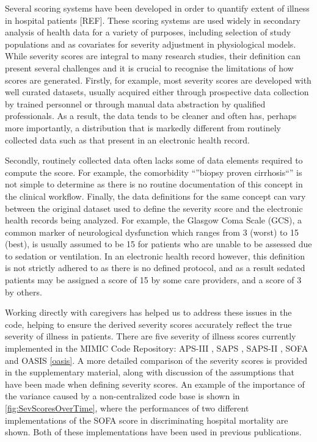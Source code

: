 \documentclass{elsart}
\begin{document}
Several scoring systems have been developed in order to quantify extent of illness in hospital patients [REF]. These scoring systems are used widely in secondary analysis of health data for a variety of purposes, including selection of study populations and as covariates for severity adjustment in physiological models. While severity scores are integral to many research studies, their definition can present several challenges and it is crucial to recognise the limitations of how scores are generated. Firstly, for example, most severity scores are developed with well curated datasets, usually acquired either through prospective data collection by trained personnel or through manual data abstraction by qualified professionals. As a result, the data tends to be cleaner and often has, perhaps more importantly, a distribution that is markedly different from routinely collected data such as that present in an electronic health record. 

Secondly, routinely collected data often lacks some of data elements required to compute the score. For example, the comorbidity ``''biopsy proven cirrhosis``'' is not simple to determine as there is no routine documentation of this concept in the clinical workflow. Finally, the data definitions for the same concept can vary between the original dataset used to define the severity score and the electronic health records being analyzed. For example, the Glasgow Coma Scale (GCS), a common marker of neurological dysfunction which ranges from 3 (worst) to 15 (best), is usually assumed to be 15 for patients who are unable to be assessed due to sedation or ventilation. In an electronic health record however, this definition is not strictly adhered to as there is no defined protocol, and as a result sedated patients may be assigned a score of 15 by some care providers, and a score of 3 by others.

Working directly with caregivers has helped us to address these issues in the code, helping to ensure the derived severity scores accurately reflect the true severity of illness in patients. There are five severity of illness scores currently implemented in the MIMIC Code Repository: APS-III \cite{aps}, SAPS \cite{saps}, SAPS-II \cite{sapsii}, SOFA \cite{sofa} and OASIS \ref{oasis}. A more detailed comparison of the severity scores is provided in the supplementary material, along with discussion of the assumptions that have been made when defining severity scores. An example of the importance of the variance caused by a non-centralized code base is shown in \ref{fig:SevScoresOverTime}, where the performances of two different implementations of the SOFA score in discriminating hospital mortality are shown. Both of these implementations have been used in previous publications.
\end{document}

